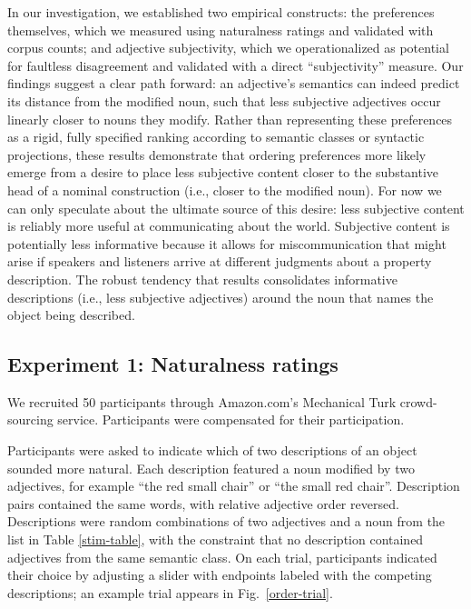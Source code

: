 \documentclass{pnastwo}
\begin{document}
\begin{article}
In our investigation, we established two empirical constructs: the preferences themselves, which we measured using naturalness ratings and validated with corpus counts; and adjective subjectivity, which we operationalized as potential for faultless disagreement and validated with a direct ``subjectivity'' measure. Our findings suggest a clear path forward: an adjective's semantics can indeed predict its distance from the modified noun, such that less subjective adjectives occur linearly closer to nouns they modify. Rather than representing these preferences as a rigid, fully specified ranking according to semantic classes or syntactic projections, these results demonstrate that ordering preferences more likely emerge from a desire to place less subjective content closer to the substantive head of a nominal construction (i.e., closer to the modified noun). For now we can only speculate about the ultimate source of this desire: less subjective content is reliably more useful at communicating about the world. Subjective content is potentially less informative because it allows for miscommunication that might arise if speakers and listeners arrive at different judgments about a property description. The robust tendency that results consolidates informative descriptions (i.e., less subjective adjectives) around the noun that names the object being described.



\newpage

\begin{materials}
\section{Experiment 1: Naturalness ratings}	
We recruited 50 participants through Amazon.com's Mechanical Turk crowd-sourcing service. Participants were compensated for their participation.

Participants were asked to indicate which of two descriptions of an object sounded more natural. Each description featured a noun modified by two adjectives, for example ``the red small chair'' or ``the small red chair''. Description pairs contained the same words, with relative adjective order reversed. Descriptions were random combinations of two adjectives and a noun from the list in Table \ref{stim-table}, with the constraint that no description contained adjectives from the same semantic class.
On each trial, participants indicated their choice by adjusting a slider with endpoints labeled with the competing descriptions; an example trial appears in Fig.\ \ref{order-trial}.


\end{materials}
\end{article}
\end{document}
